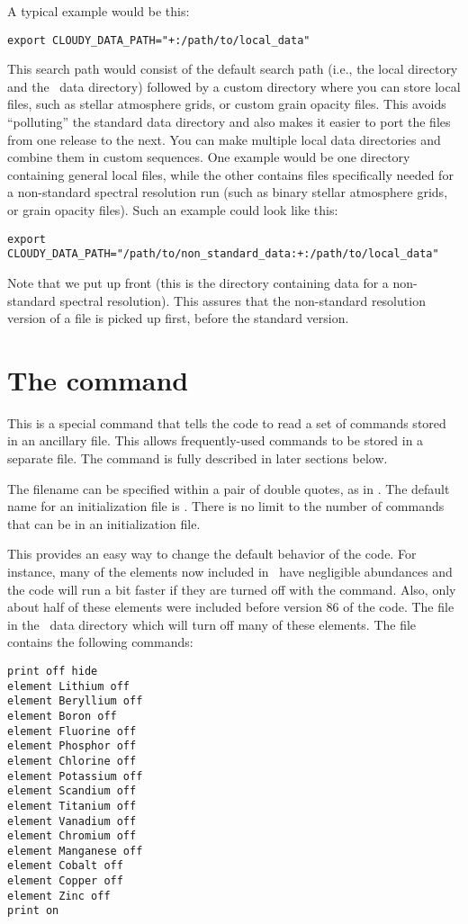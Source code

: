 A typical example would be this:
\begin{verbatim}
export CLOUDY_DATA_PATH="+:/path/to/local_data"
\end{verbatim}
This search path would consist of the default search path (i.e., the local
directory and the \Cloudy\ data directory) followed by a custom directory
 where you can store local files, such as
stellar atmosphere grids, or custom grain opacity files. This avoids
``polluting'' the standard data directory and also makes it easier to port the
files from one release to the next. You can make multiple local data
directories and combine them in custom sequences. One example would be one
directory containing general local files, while the other contains files
specifically needed for a non-standard spectral resolution run (such as binary
stellar atmosphere grids, or grain opacity files). Such an example could look
like this:
\begin{verbatim}
export CLOUDY_DATA_PATH="/path/to/non_standard_data:+:/path/to/local_data"
\end{verbatim}
Note that we put  up front (this is
the directory containing data for a non-standard spectral resolution). This
assures that the non-standard resolution version of a file is picked up first,
before the standard version.

\section{The  command}

\noindent
This is a special command that tells the code to read a set of commands
stored in an ancillary file.  This allows frequently-used commands to be
stored in a separate file.
The  command is fully described in later sections below.

The filename can be specified within a pair of double quotes, as in
.
The default name for an initialization file is
.
There is no limit to the number of commands that can be in an
initialization file.

This provides an easy way to change the default behavior of the code.
For instance, many of the elements now included in \Cloudy\ have
negligible abundances and the code will run a bit faster
if they are turned off with
the  command.
Also, only about half of these
elements were included before version 86 of the code.
The file  in the \Cloudy\ data directory
which will turn off many of these elements.
The  file contains
the following commands:
\begin{verbatim}
print off hide
element Lithium off
element Beryllium off
element Boron off
element Fluorine off
element Phosphor off
element Chlorine off
element Potassium off
element Scandium off
element Titanium off
element Vanadium off
element Chromium off
element Manganese off
element Cobalt off
element Copper off
element Zinc off
print on
\end{verbatim}

